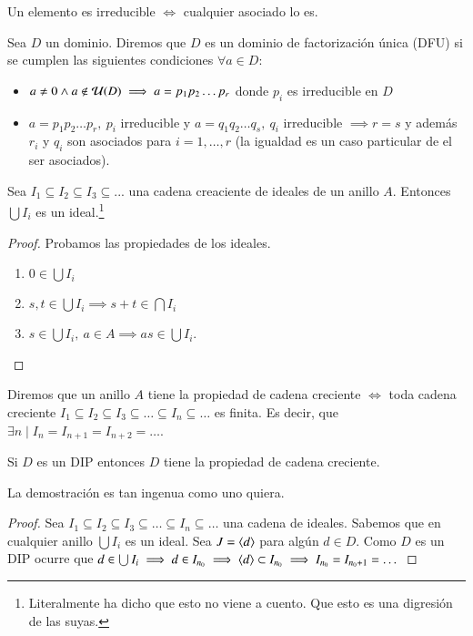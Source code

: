 \begin{obs}
	Un elemento es irreducible $\iff$ cualquier asociado lo es.
\end{obs}

\begin{dfn}
	Sea $D$ un dominio. Diremos que $D$ es un dominio de factorización única (DFU) si se cumplen las siguientes condiciones $\forall a \in D$:
	\begin{itemize}
		\item $a \neq 0 \land a \not\in\mathcal{U}(D) \implies a = p_1p_2\dots p_r$ donde $p_i$ es irreducible en $D$
		\item $a = p_1p_2\dots p_r,\ p_i$ irreducible y $a = q_1q_2 \dots q_s,\ q_i$ irreducible $\implies r = s$ y además $r_i$ y $q_i$ son asociados para $i = 1, \dots, r$ (la igualdad es un caso particular de el ser asociados).
	\end{itemize}
\end{dfn}

\begin{obs}
	Sea $I_1 \subseteq I_2 \subseteq I_3 \subseteq ...$ una cadena creaciente de ideales de un anillo $A$. Entonces $\bigcup I_i$ es un ideal.\footnote{Literalmente ha dicho que esto no viene a cuento. Que esto es una digresión de las suyas.}
\end{obs}

\begin{proof}
	Probamos las propiedades de los ideales.
	\begin{enumerate}
		\item $0 \in \bigcup I_i$
		\item $s,t \in \bigcup I_i \implies s+t \in \bigcap I_i$
		\item $s \in \bigcup I_i,\ a \in A \implies as \in \bigcup I_i$.
	\end{enumerate}
\end{proof}

\begin{dfn}
	
	Diremos que un anillo $A$ tiene la propiedad de cadena creciente $\iff$ toda cadena creciente $I_1 \subseteq I_2 \subseteq I_3 \subseteq \dots \subseteq I_n \subseteq \dots$ es finita. Es decir, que $\exists n \mid I_n = I_{n+1} = I_{n+2} = \dots$.
\end{dfn}

\begin{thm}
	Si $D$ es un DIP entonces $D$ tiene la propiedad de cadena creciente.
\end{thm}

La demostración es tan ingenua como uno quiera.

\begin{proof}
	Sea $I_1 \subseteq I_2 \subseteq I_3 \subseteq \dots \subseteq I_n \subseteq \dots$ una cadena de ideales. Sabemos que en cualquier anillo $\bigcup I_i$ es un ideal. Sea $J = \langle d\rangle$ para algún $d \in D$. Como $D$ es un DIP ocurre que $d \in \bigcup I_i \implies d \in I_{n_0} \implies \langle d\rangle \subset I_{n_0} \implies I_{n_0} = I_{n_0 + 1} = \dots$
\end{proof}

